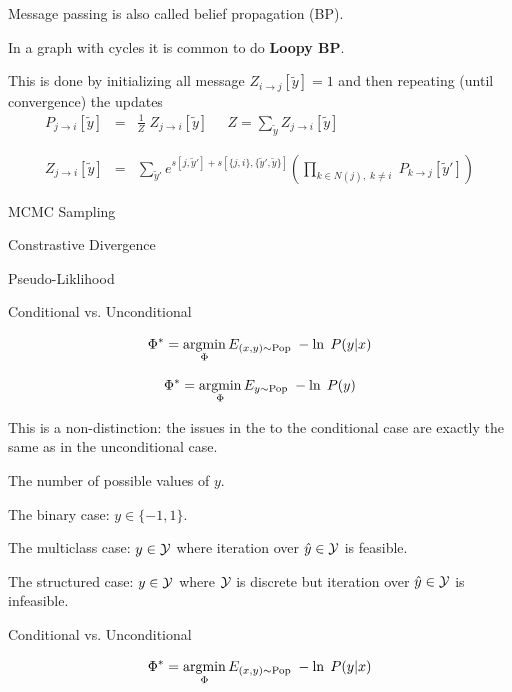 {

Message passing is also called belief propagation (BP).

\vfill
In a graph with cycles it is common to do {\bf Loopy BP}.

\vfill
This is done by initializing all message $Z_{i \rightarrow j}[\tilde{y}] = 1$ and then repeating (until convergence) the updates
\vfill
\begin{eqnarray*}
  P_{j \rightarrow i}[\tilde{y}] & = & \frac{1}{Z}\;Z_{j \rightarrow i}[\tilde{y}] \;\;\;\;\;Z = \sum_{\tilde{y}} Z_{j \rightarrow i}[\tilde{y}] \\
  \\
  \\
  Z_{j\rightarrow i}[\tilde{y}] & = & \sum_{\tilde{y}'}  e^{s[j,\tilde{y}'] + s[\{j,i\},\{\tilde{y}',\tilde{y}\}]}
    \left(\prod_{k \in N(j),\;k \not = i}\;P_{k\rightarrow j}[\tilde{y}']\right)
\end{eqnarray*}


MCMC Sampling

\vfill
Constrastive Divergence

\vfill
Pseudo-Liklihood


Conditional vs. Unconditional

\vfill
$$\Phi^* = \operatorname*{argmin}_\Phi E_{(x,y) \sim \mathrm{Pop}}\;-\ln \;P(y|x)$$

\vfill
$$\Phi^* = \operatorname*{argmin}_\Phi E_{y \sim \mathrm{Pop}}\;-\ln \;P(y)$$

\vfill
This is a non-distinction: the issues in the to the conditional case
are exactly the same as in the unconditional case.


The number of possible values of $y$.

\vfill
The binary case: $y \in \{-1,1\}$.

\vfill
The multiclass case: $y \in {\cal Y}$ where iteration over $\hat{y} \in {\cal Y}$ is feasible.

\vfill
{\color{red} The structured case: $y \in {\cal Y}$ where ${\cal Y}$ is discrete but iteration over $\hat{y} \in {\cal Y}$ is infeasible.}


Conditional vs. Unconditional

\vfill
$$\Phi^* = \operatorname*{argmin}_\Phi E_{(x,y) \sim \mathrm{Pop}}\;-\ln \;P(y|x)$$

}
